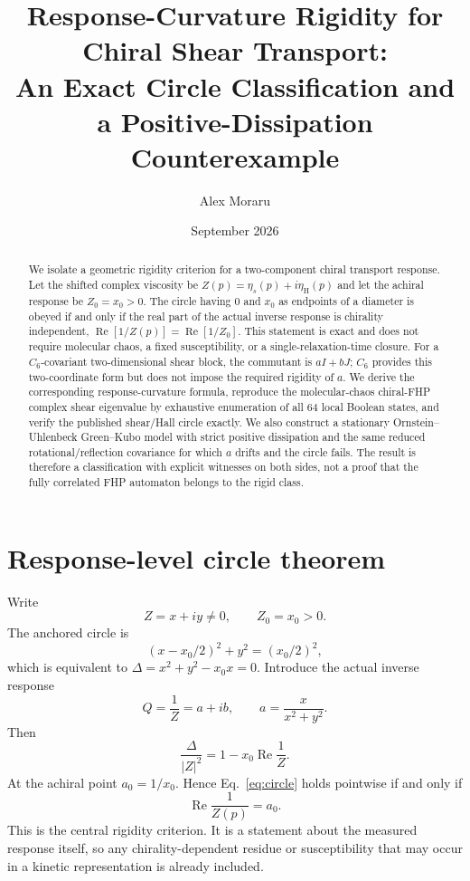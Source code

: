 \documentclass[11pt]{article}
\title{Response-Curvature Rigidity for Chiral Shear Transport:\\An Exact Circle Classification and a Positive-Dissipation Counterexample}
\author{Alex Moraru}
\date{September 2026}
\newcommand{\Ree}{\operatorname{Re}}
\begin{document}
\maketitle

\begin{abstract}
We isolate a geometric rigidity criterion for a two-component chiral transport response.  Let the shifted complex viscosity be $Z(p)=\eta_s(p)+i\eta_{\mathrm H}(p)$ and let the achiral response be $Z_0=x_0>0$.  The circle having $0$ and $x_0$ as endpoints of a diameter is obeyed if and only if the real part of the actual inverse response is chirality independent, $\Ree[1/Z(p)]=\Ree[1/Z_0]$.  This statement is exact and does not require molecular chaos, a fixed susceptibility, or a single-relaxation-time closure.  For a $C_6$-covariant two-dimensional shear block, the commutant is $aI+bJ$; $C_6$ provides this two-coordinate form but does not impose the required rigidity of $a$.  We derive the corresponding response-curvature formula, reproduce the molecular-chaos chiral-FHP complex shear eigenvalue by exhaustive enumeration of all 64 local Boolean states, and verify the published shear/Hall circle exactly.  We also construct a stationary Ornstein--Uhlenbeck Green--Kubo model with strict positive dissipation and the same reduced rotational/reflection covariance for which $a$ drifts and the circle fails.  The result is therefore a classification with explicit witnesses on both sides, not a proof that the fully correlated FHP automaton belongs to the rigid class.
\end{abstract}

\section{Response-level circle theorem}
Write
\begin{equation}
  Z=x+iy\ne0,\qquad Z_0=x_0>0.
\end{equation}
The anchored circle is
\begin{equation}
 (x-x_0/2)^2+y^2=(x_0/2)^2,
 \label{eq:circle}
\end{equation}
which is equivalent to $\Delta=x^2+y^2-x_0x=0$.  Introduce the actual inverse response
\begin{equation}
 Q=\frac{1}{Z}=a+ib,
 \qquad a=\frac{x}{x^2+y^2}.
\end{equation}
Then
\begin{equation}
 \frac{\Delta}{|Z|^2}=1-x_0\Ree\frac{1}{Z}.
 \label{eq:master}
\end{equation}
At the achiral point $a_0=1/x_0$.  Hence Eq.~\eqref{eq:circle} holds pointwise if and only if
\begin{equation}
 \Ree\frac{1}{Z(p)}=a_0.
 \label{eq:rigidity}
\end{equation}
This is the central rigidity criterion.  It is a statement about the measured response itself, so any chirality-dependent residue or susceptibility that may occur in a kinetic representation is already included.
\end{document}
